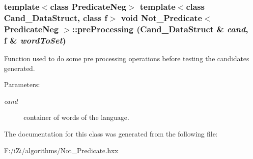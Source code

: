 \subsubsection{\setlength{\rightskip}{0pt plus 5cm}template$<$class Predicate\-Neg$>$ template$<$class Cand\_\-Data\-Struct, class f$>$ void {\bf Not\_\-Predicate}$<$ Predicate\-Neg $>$::pre\-Processing (Cand\_\-Data\-Struct \& {\em cand}, f \& {\em word\-To\-Set})\hspace{0.3cm}{\tt  [inline]}}\label{class_not___predicate_8282dfa9cdd77232c633264d73cab680}


Function used to do some pre processing operations before testing the candidates generated. 

\begin{Desc}
\item[Parameters:]
\begin{description}
\item[{\em cand}]container of words of the language. \end{description}
\end{Desc}


The documentation for this class was generated from the following file:\begin{CompactItemize}
\item 
F:/i\-Zi/algorithms/Not\_\-Predicate.hxx\end{CompactItemize}

